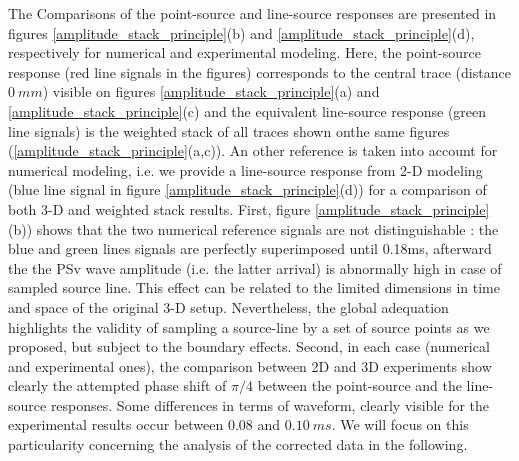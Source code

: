 \documentclass[manuscript,revised]{geophysics}
\newcommand{\twod}{2-D }
\newcommand{\thrd}{3-D }
\begin{document}
\noindent The Comparisons of the point-source and line-source responses are presented in figures \ref{amplitude_stack_principle}(b) and \ref{amplitude_stack_principle}(d), respectively for numerical and experimental modeling. Here, the point-source response (red line signals in the figures) corresponds to the central trace (distance $0\ mm$) visible on figures \ref{amplitude_stack_principle}(a) and \ref{amplitude_stack_principle}(c) and the equivalent line-source response (green line signals) is the weighted stack of all traces shown onthe same figures (\ref{amplitude_stack_principle}(a,c)).  An other reference is taken into account for numerical modeling, i.e. we provide a line-source response from \twod modeling (blue line signal in figure \ref{amplitude_stack_principle}(d)) for a comparison of both \thrd and weighted stack results. First, figure \ref{amplitude_stack_principle}(b)) shows that the two numerical reference signals are not distinguishable : the blue and green lines signals are perfectly superimposed until 0.18ms, afterward the the PSv wave amplitude (i.e. the latter arrival) is abnormally high in case of sampled source line. This effect can be related to the limited dimensions in time and space of the original \thrd setup. Nevertheless, the global adequation highlights the validity of sampling a source-line by a set of source points as we proposed, but subject to the boundary effects. Second, in each case (numerical and experimental ones), the comparison between 2D and 3D experiments show clearly the attempted phase shift of $\pi/4$ between the point-source and the line-source responses. Some differences in terms of waveform, clearly visible for the experimental results occur between $0.08$ and $0.10\ ms$. We will focus on this particularity concerning the analysis of the corrected data in the following.
\end{document}
